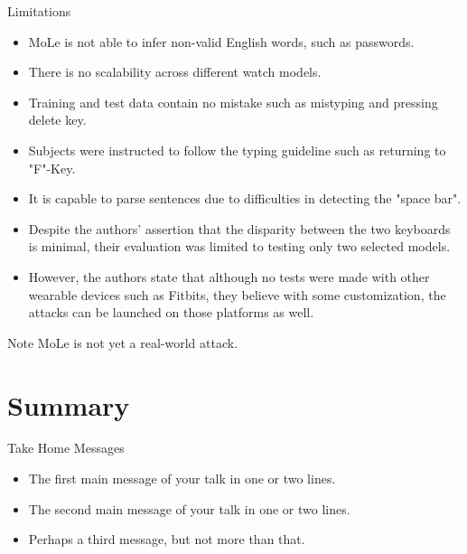 \documentclass[ucs,9pt]{beamer}
\begin{document}
\begin{frame}{Limitations}
\begin{itemize}
	\item MoLe is not able to infer non-valid English words, such as passwords.
\item There is no scalability across different watch models.
\item Training and test data contain no mistake such as mistyping and pressing delete key.
\item Subjects were instructed to follow the typing guideline such as returning to "F"-Key.
\item It is capable to parse sentences due to difficulties in detecting the "space bar".
\item Despite the authors' assertion that the disparity between the two keyboards is minimal, their evaluation was limited to testing only two selected models.
\item However, the authors state that although no tests were made with other wearable devices such as Fitbits, they believe with some customization, the attacks can be launched on those platforms as well.
\end{itemize}
	\pause 	
	\begin{alertblock}{Note}
		MoLe is not yet a real-world attack.
	\end{alertblock}
\end{frame}






\section*{Summary}

\begin{frame}{Take Home Messages}

  \begin{itemize}
  \item
    The \alert{first main message} of your talk in one or two lines.
  \item
    The \alert{second main message} of your talk in one or two lines.
  \item
    Perhaps a \alert{third message}, but not more than that.
  \end{itemize}
\end{frame}



\appendix
\end{document}
